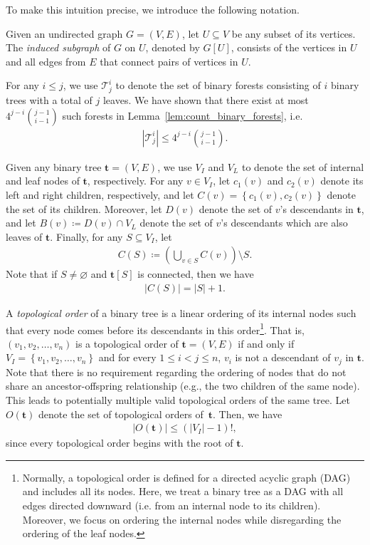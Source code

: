 \documentclass[superscriptaddress,onecolumn,nofootinbib,longbibliography,a4paper,accepted=2026-09-29]{quantumarticle}
\theoremstyle{plain}
\theoremstyle{definition}
\numberwithin{thm}{section}
\numberwithin{assumption}{section}
\numberwithin{lemma}{section}
\numberwithin{prop}{section}
\numberwithin{cor}{section}
\numberwithin{definition}{section}
\numberwithin{rmk}{section}
\numberwithin{equation}{section}
\newcommand{\lrb}[1]{\left ( #1 \right )}
\newcommand{\lrcb}[1]{\left \{ #1 \right \}}
\newcommand{\defeq}{\coloneqq}
\renewcommand{\emptyset}{\varnothing}
\newcommand{\mbt}{\mathbf{t}}
\begin{document}
To make this intuition precise, we introduce the following notation.

Given an undirected graph \( G = (V, E) \), let \( U \subseteq V \) be any subset of its vertices. The \emph{induced subgraph} of \( G \) on \( U \), denoted by $G[U]$, consists of the vertices in \( U \) and all edges from \( E \) that connect pairs of vertices in \( U \). 

For any $i \le j$, we use $\mathcal{T}^i_j$ to denote the set of binary forests consisting of $i$ binary trees with a total of $j$ leaves. We have shown that there exist at most $4^{j-i}\binom{j-1}{i-1}$ such forests in Lemma~\ref{lem:count_binary_forests}, i.e. 
\begin{align}
|\mathcal{T}^i_j|\le 4^{j-i}\binom{j-1}{i-1}.    
\end{align}

Given any binary tree $\mbt=(V, E)$, we use $V_I$ and $V_L$ to denote the set of internal and leaf nodes of $\mbt$, respectively. For any $v \in V_I$, let $c_1(v)$ and $c_2(v)$ denote its left and right children, respectively, and let $C(v)=\lrcb{c_1(v), c_2(v)}$ denote the set of its children. Moreover, let $D(v)$ denote the set of $v$'s descendants in $\mbt$, and let $B(v) \defeq D(v)\cap V_L$ denote the set of $v$'s descendants which are also leaves of $\mbt$. Finally, for any $S \subseteq V_I$, let 
\begin{align}
C(S) \defeq \lrb{\bigcup_{v \in S} C(v)} \setminus S.    
\end{align}
Note that if $S \neq \emptyset$ and $\mbt[S]$ is connected, then we have 
\begin{align}
|C(S)|=|S|+1.    
\end{align}

A \emph{topological order} of a binary tree is a linear ordering of its internal nodes such that every node comes before its descendants in this order\footnote{Normally, a topological order is defined for a directed acyclic graph (DAG) and includes all its nodes. Here, we treat a binary tree as a DAG with all edges directed downward (i.e. from an internal node to its children). Moreover, we focus on ordering the internal nodes while disregarding the ordering of the leaf nodes.}. That is, $(v_1,v_2,\dots,v_n)$ is a topological order of $\mbt=(V, E)$ if and only if $V_I=\lrcb{v_1,v_2,\dots,v_n}$ and for every $1 \le i < j \le n$, $v_i$ is not a descendant of $v_j$ in $\mbt$. Note that there is no requirement regarding the ordering of nodes that do not share an ancestor-offspring relationship (e.g., the two children of the same node). This leads to potentially multiple valid topological orders of the same tree. Let $O(\mbt)$ denote the set of topological orders of~$\mbt$. Then, we have 
\begin{align}
|O(\mbt)| \le (|V_I|-1)!,    
\end{align}
since every topological order begins with the root of $\mbt$.
\end{document}
